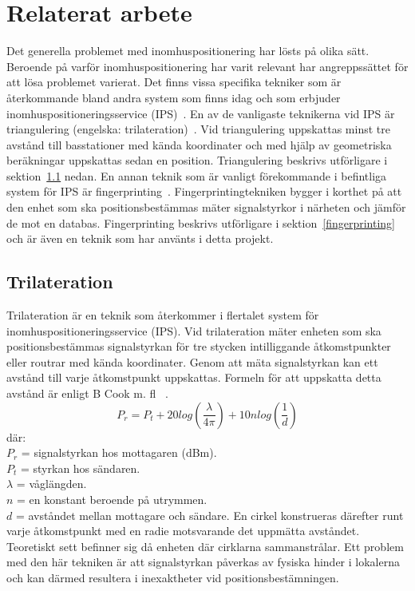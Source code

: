 \documentclass[a4paper,12pt]{article}
\begin{document}
 \section{Relaterat arbete}
 Det generella problemet med inomhuspositionering har lösts på olika sätt.
 Beroende på varför inomhuspositionering har varit relevant har angreppssättet för att lösa problemet varierat. Det finns vissa specifika tekniker som är återkommande bland andra system som finns idag och som erbjuder inomhuspositioneringsservice (IPS)~\cite{IP1}.
 En av de vanligaste teknikerna vid IPS är triangulering (engelska: trilateration)~\cite{cook2005indoor}. Vid triangulering uppskattas minst tre avstånd till basstationer med kända koordinater och med hjälp av geometriska beräkningar uppskattas sedan en position. Triangulering beskrivs utförligare i sektion~\ref{triangulering}
  nedan. En annan teknik som är vanligt förekommande i befintliga system för IPS är fingerprinting~\cite{IP1,jun2018low}. Fingerprintingtekniken bygger i korthet på att den enhet som ska positionsbestämmas mäter signalstyrkor i närheten och jämför de mot en databas. Fingerprinting beskrivs utförligare i sektion~\ref{fingerprinting} och är även en teknik som har använts i detta projekt.



 \subsection{Trilateration}\label{triangulering}
 Trilateration är en teknik som återkommer i flertalet system för inomhuspositioneringsservice (IPS). Vid trilateration mäter enheten som ska positionsbestämmas signalstyrkan för tre stycken intilliggande åtkomstpunkter eller routrar med kända koordinater. Genom att mäta signalstyrkan kan ett avstånd till varje åtkomstpunkt uppskattas. Formeln för att uppskatta detta avstånd är enligt B Cook m. fl ~\cite{cook2005indoor}.
 \newline
 $$ P_r = P_t + 20log(\frac{\lambda}{4\pi}) + 10nlog(\frac{1}{d})$$
 där:\\
 $  P_r $ = signalstyrkan hos mottagaren (dBm).\\
 $P_t$ = styrkan hos sändaren.\\
 $\lambda$ = våglängden.\\
 $ n $ = en konstant beroende på utrymmen.\\
 $ d $ = avståndet mellan mottagare och sändare.
 \bigskip
 \newline
 En cirkel konstrueras därefter runt varje åtkomstpunkt med en radie motsvarande det uppmätta avståndet. Teoretiskt sett befinner sig då enheten där cirklarna sammanstrålar. Ett problem med den här tekniken är att signalstyrkan påverkas av fysiska hinder i lokalerna och kan därmed resultera i inexaktheter vid positionsbestämningen.
\end{document}
